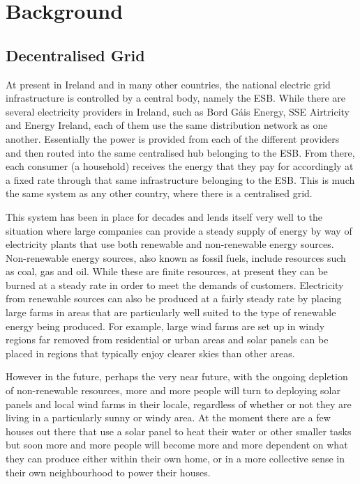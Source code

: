 \documentclass[a4paper, notitlepage]{report}
\begin{document}
\part{Background}
\label{sec:orgd1c217d}
\chapter{Decentralised Grid}
\label{sec:org12593d0}
At present in Ireland and in many other countries, the national electric grid
infrastructure is controlled by a central body, namely the ESB. While there are
several electricity providers in Ireland, such as Bord Gáis Energy, SSE
Airtricity and Energy Ireland, each of them use the same distribution network as
one another. Essentially the power is provided from each of the different
providers and then routed into the same centralised hub belonging to the ESB.
From there, each consumer (a household) receives the energy that they pay for
accordingly at a fixed rate through that same infrastructure belonging to the
ESB. This is much the same system as any other country, where there is a
centralised grid. 

This system has been in place for decades and lends itself very well to the
situation where large companies can provide a steady supply of energy by way of
electricity plants that use both renewable and non-renewable energy sources.
Non-renewable energy sources, also known as fossil fuels, include resources such
as coal, gas and oil. While these are finite resources, at present they can be
burned at a steady rate in order to meet the demands of customers. Electricity
from renewable sources can also be produced at a fairly steady rate by placing
large farms in areas that are particularly well suited to the type of renewable
energy being produced. For example, large wind farms are set up in windy
regions far removed from residential or urban areas and solar panels can be
placed in regions that typically enjoy clearer skies than other areas.

However in the future, perhaps the very near future, with the ongoing depletion
of non-renewable resources, more and more people will turn to deploying solar
panels and local wind farms in their locale, regardless of whether or not they
are living in a particularly sunny or windy area. At the moment there are a few
houses out there that use a solar panel to heat their water or other smaller
tasks but soon more and more people will become more and more dependent on what
they can produce either within their own home, or in a more collective sense in
their own neighbourhood to power their houses.
\end{document}
